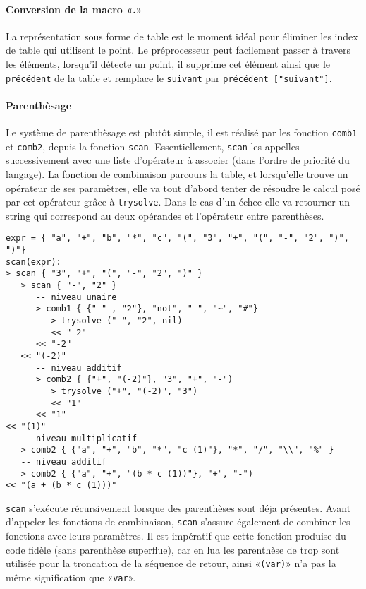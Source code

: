 \documentclass{article}
\begin{document}
\paragraph{Conversion de la macro «.»}
La représentation sous forme de table est le moment idéal pour éliminer les index de table qui utilisent le point. Le préprocesseur peut facilement passer à travers les éléments, lorsqu'il détecte un point, il supprime cet élément ainsi que le \texttt{précédent} de la table et remplace le \texttt{suivant} par \texttt{précédent ["suivant"]}.

\newpage
\paragraph{Parenthèsage} 
Le système de parenthèsage est plutôt simple, il est réalisé par les fonction \texttt{comb1} et \texttt{comb2}, depuis la fonction \texttt{scan}. Essentiellement, \texttt{scan} les appelles successivement avec une liste d'opérateur à associer (dans l'ordre de priorité du langage). La fonction de combinaison parcours la table, et lorsqu'elle trouve un opérateur de ses paramètres, elle va tout d'abord tenter de résoudre le calcul posé par cet opérateur grâce à \texttt{trysolve}. Dans le cas d'un échec elle va retourner un string qui correspond au deux opérandes et l'opérateur entre parenthèses.
\begin{lstlisting}[caption={Trace partielle d'exécution de la fonction scan},label=DescriptiveLabel]
expr = { "a", "+", "b", "*", "c", "(", "3", "+", "(", "-", "2", ")", ")"}
scan(expr):
> scan { "3", "+", "(", "-", "2", ")" }
   > scan { "-", "2" }
      -- niveau unaire
      > comb1 { {"-" , "2"}, "not", "-", "~", "#"} 
         > trysolve ("-", "2", nil)
         << "-2"
      << "-2"
   << "(-2)"
      -- niveau additif
      > comb2 { {"+", "(-2)"}, "3", "+", "-") 
         > trysolve ("+", "(-2)", "3")
         << "1"
      << "1"
<< "(1)"
   -- niveau multiplicatif
   > comb2 { {"a", "+", "b", "*", "c (1)"}, "*", "/", "\\", "%" }
   -- niveau additif
   > comb2 { {"a", "+", "(b * c (1))"}, "+", "-")
<< "(a + (b * c (1)))"
\end{lstlisting}

\texttt{scan} s'exécute récursivement lorsque des parenthèses sont déja présentes. Avant d'appeler les fonctions de combinaison, \texttt{scan} s'assure également de combiner les fonctions avec leurs paramètres. Il est impératif que cette fonction produise du code fidèle (sans parenthèse superflue), car en lua les parenthèse de trop sont utilisée pour la troncation de la séquence de retour, ainsi «\texttt{(var)}» n'a pas la même signification que «\texttt{var}».
\end{document}
